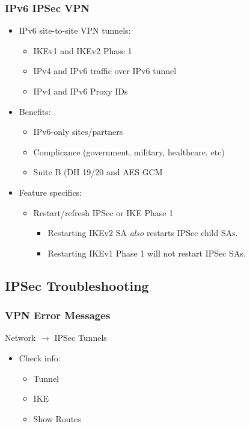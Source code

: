 \subsubsection{IPv6 IPSec VPN}
\begin{itemize}
    \item IPv6 site-to-site VPN tunnels:
        \begin{itemize}
            \item IKEv1 and IKEv2 Phase 1
            \item IPv4 and IPv6 traffic over IPv6 tunnel
            \item IPv4 and IPv6 Proxy IDs
        \end{itemize}
    \item Benefits:
        \begin{itemize}
            \item IPv6-only sites/partners
            \item Complicance (government, military, healthcare, etc)
            \item Suite B (DH 19/20 and AES GCM
        \end{itemize}
    \item Feature specifics:
        \begin{itemize}
            \item Restart/refresh IPSec or IKE Phase 1
                \begin{itemize}
                    \item Restarting IKEv2 SA \textit{also} restarts IPSec child SAs.
                    \item Restarting IKEv1 Phase 1 will not restart IPSec SAs.
                \end{itemize}
        \end{itemize}
\end{itemize}

\subsection{IPSec Troubleshooting}
\subsubsection{VPN Error Messages}
Network $\rightarrow$ IPSec Tunnels
\begin{itemize}
    \item Check info:
        \begin{itemize}
            \item Tunnel
            \item IKE
            \item Show Routes
        \end{itemize}
\end{itemize}

